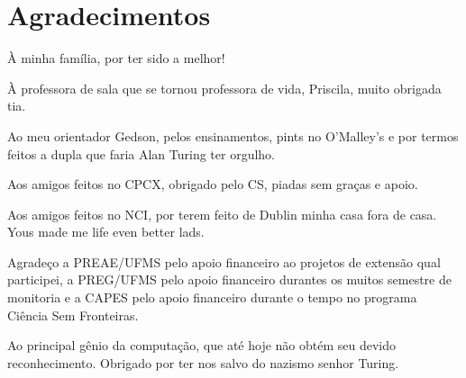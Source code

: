 
\chapter*{Agradecimentos} \label{Cap:Agradecimentos}
À minha família, por ter sido a melhor!

À professora de sala que se tornou professora de vida, Priscila, muito obrigada tia.

Ao meu orientador Gedson, pelos ensinamentos, pints no O'Malley's e por termos feitos a dupla que faria Alan Turing ter orgulho.

Aos amigos feitos no CPCX, obrigado pelo CS, piadas sem graças e apoio. 

Aos amigos feitos no NCI, por terem feito de Dublin minha casa fora de casa. Yous made me life even better lads.

Agradeço a PREAE/UFMS pelo apoio financeiro ao projetos de extensão qual participei, a PREG/UFMS pelo apoio financeiro durantes os muitos semestre de monitoria e a CAPES pelo apoio financeiro durante o tempo no programa Ciência Sem Fronteiras.

Ao principal gênio da computação, que até hoje não obtém seu devido reconhecimento. Obrigado por ter nos salvo do nazismo senhor Turing.



